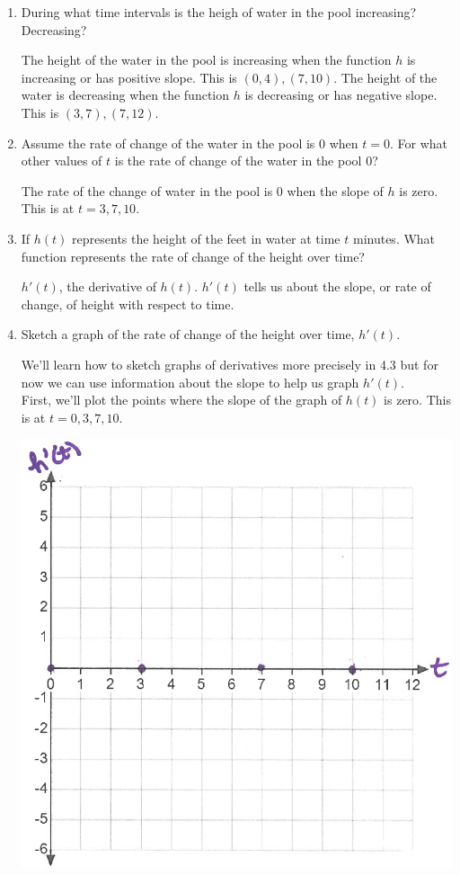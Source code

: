 \documentclass[nooutcomes,handout]{ximera}
\begin{document}
\begin{problem}
	\begin{enumerate}
		\item During what time intervals is the heigh of water in the pool increasing? Decreasing?
			\begin{freeResponse}
			The height of the water in the pool is increasing when the function $h$ is increasing or has positive slope.  This is $(0,4),(7,10)$.  The height of the water is decreasing when the function $h$ is decreasing or has negative slope.  This is $(3,7),(7,12)$.
			\end{freeResponse}
		\item  Assume the rate of change of the water in the pool is $0$ when $t=0$.  For what other values of $t$ is the rate of change of the water in the pool $0$?
			\begin{freeResponse}
			The rate of the change of water in the pool is $0$ when the slope of $h$ is zero.  This is at $t=3,7,10$.
			\end{freeResponse}
		\item If $h(t)$ represents the height of the feet in water at time $t$ minutes.  What function represents the rate of change of the height over time?
			\begin{freeResponse}
				$h'(t)$, the derivative of $h(t)$.  $h'(t)$ tells us about the slope, or rate of change, of height with respect to time.
			\end{freeResponse}
		\item Sketch a graph of the rate of change of the height over time, $h'(t)$.
			\begin{freeResponse}
			We'll learn how to sketch graphs of derivatives more precisely in 4.3 but for now we can use information about the slope to help us graph $h'(t)$.\\
			First, we'll plot the points where the slope of the graph of $h(t)$ is zero.  This is at $t=0,3,7,10$.
			\begin{image}
			\includegraphics[scale=.4]{Figure10.png}

\end{image}
\end{freeResponse}
\end{enumerate}
\end{problem}
\end{document}
